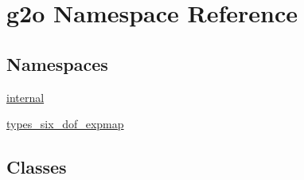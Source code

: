 \hypertarget{namespaceg2o}{}\section{g2o Namespace Reference}
\label{namespaceg2o}
\subsection*{Namespaces}
\begin{DoxyCompactItemize}
\item 
 \mbox{\hyperlink{namespaceg2o_1_1internal}{internal}}
\item 
 \mbox{\hyperlink{namespaceg2o_1_1types__six__dof__expmap}{types\+\_\+six\+\_\+dof\+\_\+expmap}}
\end{DoxyCompactItemize}
\subsection*{Classes}
